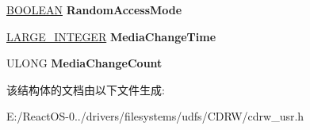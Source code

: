 \begin{DoxyCompactItemize}
\item 
\mbox{\label{struct___g_e_t___l_a_s_t___e_r_r_o_r___u_s_e_r___o_u_t_aaccc5c2e9b823966f4d5dac552960811}} 
\hyperlink{_processor_bind_8h_a112e3146cb38b6ee95e64d85842e380a}{B\+O\+O\+L\+E\+AN} {\bfseries Random\+Access\+Mode}
\item 
\mbox{\label{struct___g_e_t___l_a_s_t___e_r_r_o_r___u_s_e_r___o_u_t_aa1179230c05eb7560c26be7ad3d65a2c}} 
\hyperlink{union___l_a_r_g_e___i_n_t_e_g_e_r}{L\+A\+R\+G\+E\+\_\+\+I\+N\+T\+E\+G\+ER} {\bfseries Media\+Change\+Time}
\item 
\mbox{\label{struct___g_e_t___l_a_s_t___e_r_r_o_r___u_s_e_r___o_u_t_adc00db55540ebfa49bdb94201b11eb5c}} 
U\+L\+O\+NG {\bfseries Media\+Change\+Count}
\end{DoxyCompactItemize}


该结构体的文档由以下文件生成\+:\begin{DoxyCompactItemize}
\item 
E\+:/\+React\+O\+S-\/0../drivers/filesystems/udfs/\+C\+D\+R\+W/cdrw\+\_\+usr.\+h\end{DoxyCompactItemize}
